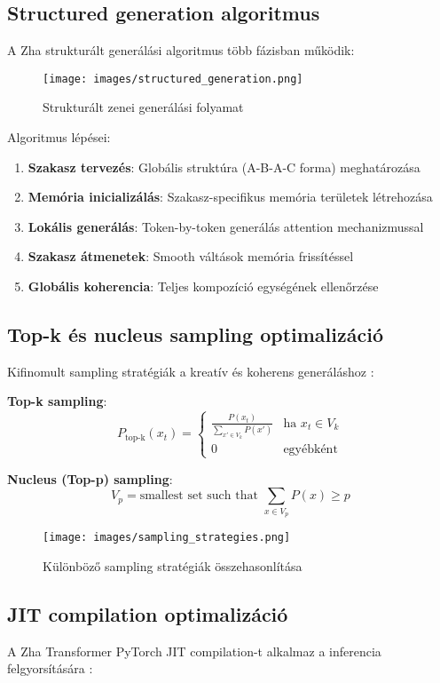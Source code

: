 \subsection{Structured generation algoritmus}
A Zha strukturált generálási algoritmus több fázisban működik:

\begin{figure}[h]
\centering
\texttt{[image: images/structured\_generation.png]}
\caption{Strukturált zenei generálási folyamat}
\label{fig:structured_gen}
\end{figure}

Algoritmus lépései:
\begin{enumerate}
\item \textbf{Szakasz tervezés}: Globális struktúra (A-B-A-C forma) meghatározása
\item \textbf{Memória inicializálás}: Szakasz-specifikus memória területek létrehozása
\item \textbf{Lokális generálás}: Token-by-token generálás attention mechanizmussal
\item \textbf{Szakasz átmenetek}: Smooth váltások memória frissítéssel
\item \textbf{Globális koherencia}: Teljes kompozíció egységének ellenőrzése
\end{enumerate}

\subsection{Top-k és nucleus sampling optimalizáció}
Kifinomult sampling stratégiák a kreatív és koherens generáláshoz \cite{zhang2020deep}:

\textbf{Top-k sampling}:
\[
P_{\text{top-k}}(x_t) = \begin{cases}
\frac{P(x_t)}{\sum_{x' \in V_k} P(x')} & \text{ha } x_t \in V_k \\
0 & \text{egyébként}
\end{cases}
\]

\textbf{Nucleus (Top-p) sampling}:
\[
V_p = \text{smallest set such that } \sum_{x \in V_p} P(x) \geq p
\]

\begin{figure}[h]
\centering
\texttt{[image: images/sampling\_strategies.png]}
\caption{Különböző sampling stratégiák összehasonlítása}
\label{fig:sampling}
\end{figure}

\subsection{JIT compilation optimalizáció}
A Zha Transformer PyTorch JIT compilation-t alkalmaz a inferencia felgyorsítására \cite{torch2023}:

